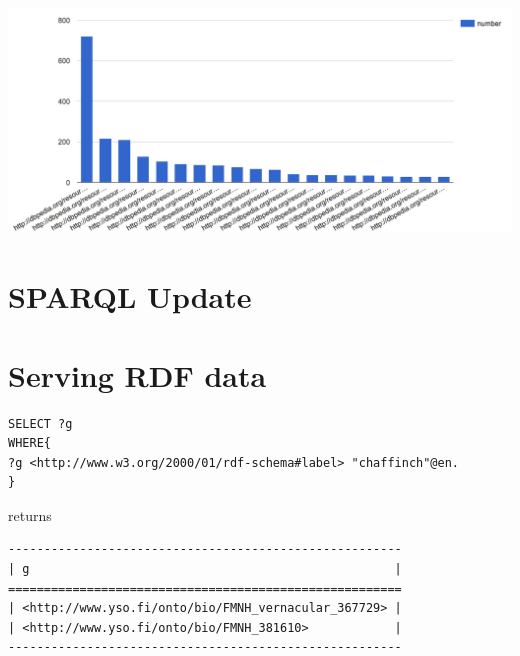 \documentclass{article}
\begin{document}
\includegraphics[width=\textwidth]{22.png}

\section{SPARQL Update}

\section{Serving RDF data}

\begin{verbatim}
SELECT ?g
WHERE{
?g <http://www.w3.org/2000/01/rdf-schema#label> "chaffinch"@en.
}
\end{verbatim}

returns \\

\begin{verbatim}
-------------------------------------------------------
| g                                                   |
=======================================================
| <http://www.yso.fi/onto/bio/FMNH_vernacular_367729> |
| <http://www.yso.fi/onto/bio/FMNH_381610>            |
-------------------------------------------------------
\end{verbatim}
\end{document}
